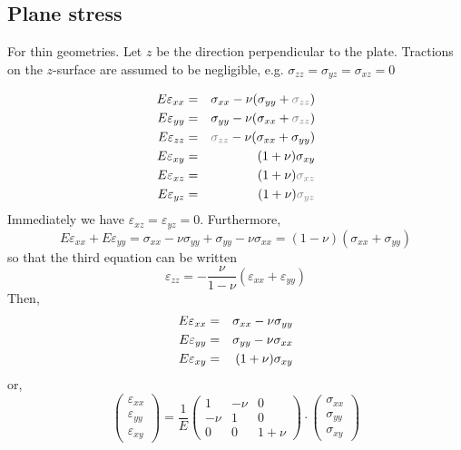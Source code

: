 \subsection{Plane stress}

For thin geometries. Let $z$ be the direction perpendicular to the plate.
Tractions  on the $z$-surface are assumed to be negligible, e.g.
$\sigma_{zz}=\sigma_{yz}=\sigma_{xz}=0$

\begin{eqnarray}
E \varepsilon_{xx} &=&  \sigma_{xx} - \nu (\sigma_{yy}+{\color{gray}\sigma_{zz}}) \nn\\
E \varepsilon_{yy} &=&  \sigma_{yy} - \nu (\sigma_{xx}+{\color{gray}\sigma_{zz}}) \nn\\
E \varepsilon_{zz} &=&  {\color{gray}\sigma_{zz}} - \nu (\sigma_{xx}+\sigma_{yy}) \nn\\
E \varepsilon_{xy} &=&  (1+\nu) \sigma_{xy} \nn\\
E \varepsilon_{xz} &=&  (1+\nu) {\color{gray}\sigma_{xz}} \nn\\
E \varepsilon_{yz} &=&  (1+\nu) {\color{gray}\sigma_{yz}} \nn 
\end{eqnarray}
Immediately we have $\varepsilon_{xz}=\varepsilon_{yz}=0$.
Furthermore, 
\[
E\varepsilon_{xx}+E\varepsilon_{yy} =  \sigma_{xx} - \nu \sigma_{yy} +  \sigma_{yy} - \nu \sigma_{xx} = (1-\nu)(\sigma_{xx}+\sigma_{yy})
\]
so that the third equation can be written
\[
\varepsilon_{zz} = -\frac{\nu}{1-\nu} ( \varepsilon_{xx}+\varepsilon_{yy})
\]
Then, 
\begin{eqnarray}
E \varepsilon_{xx} &=&  \sigma_{xx} - \nu \sigma_{yy} \nonumber\\
E \varepsilon_{yy} &=&  \sigma_{yy} - \nu \sigma_{xx} \nonumber\\
E \varepsilon_{xy} &=&  (1+\nu) \sigma_{xy} 
\end{eqnarray}
or,
\begin{equation}
\left(
\begin{array}{c}
\varepsilon_{xx}\\
\varepsilon_{yy}\\
\varepsilon_{xy}
\end{array}
\right)
=\frac1E
\left(
\begin{array}{ccc}
1 & -\nu & 0 \\
-\nu & 1 & 0 \\
0 & 0 & 1+\nu
\end{array}
\right)
\cdot
\left(
\begin{array}{c}
\sigma_{xx}\\
\sigma_{yy}\\
\sigma_{xy}
\end{array}
\right)
\end{equation}
